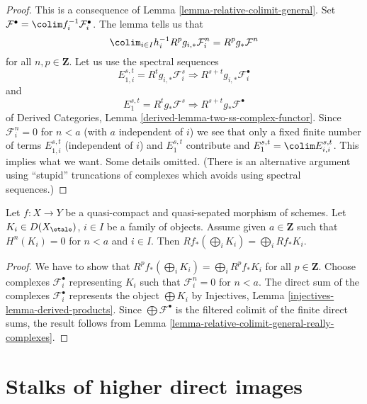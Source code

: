 \begin{proof}
This is a consequence of Lemma \ref{lemma-relative-colimit-general}. Set
$\mathcal{F}^\bullet = \colim f_i^{-1}\mathcal{F}_i^\bullet$.
The lemma tells us that
$$
\colim_{i \in I} h_i^{-1}R^pg_{i, *}\mathcal{F}_i^n = R^pg_*\mathcal{F}^n
$$
for all $n, p \in \mathbf{Z}$. Let us use the spectral sequences
$$
E_{1, i}^{s, t} = R^tg_{i, *}\mathcal{F}_i^s \Rightarrow
R^{s + t}g_{i, *}\mathcal{F}_i^\bullet
$$
and
$$
E_1^{s, t} = R^tg_*\mathcal{F}^s \Rightarrow
R^{s + t}g_*\mathcal{F}^\bullet
$$
of Derived Categories, Lemma \ref{derived-lemma-two-ss-complex-functor}.
Since $\mathcal{F}_i^n = 0$ for $n < a$ (with $a$ independent of $i$)
we see that only a fixed finite number of terms $E_{1, i}^{s, t}$
(independent of $i$) and $E_1^{s, t}$ contribute and
$E_1^{s, t} = \colim E_{i, i}^{s, t}$.
This implies what we want. Some details omitted.
(There is an alternative argument using ``stupid'' truncations
of complexes which avoids using spectral sequences.)
\end{proof}

\begin{lemma}
\label{lemma-direct-sum-bounded-below-pushforward}
Let $f : X \to Y$ be a quasi-compact and quasi-sepated morphism of
schemes. Let $K_i \in D(X_\etale)$, $i \in I$ be a family of objects.
Assume given $a \in \mathbf{Z}$ such that $H^n(K_i) = 0$ for $n < a$
and $i \in I$. Then $Rf_*(\bigoplus_i K_i) = \bigoplus_i Rf_*K_i$.
\end{lemma}

\begin{proof}
We have to show that $R^pf_*(\bigoplus_i K_i) =
\bigoplus_i R^pf_*K_i$ for all $p \in \mathbf{Z}$.
Choose complexes $\mathcal{F}_i^\bullet$ representing $K_i$
such that $\mathcal{F}_i^n = 0$ for $n < a$.
The direct sum of the complexes $\mathcal{F}_i^\bullet$
represents the object $\bigoplus K_i$ by
Injectives, Lemma \ref{injectives-lemma-derived-products}.
Since $\bigoplus \mathcal{F}^\bullet$ is the filtered
colimit of the finite direct sums, the result follows
from Lemma \ref{lemma-relative-colimit-general-really-complexes}.
\end{proof}














\section{Stalks of higher direct images}
\label{section-stalks-direct-image}

